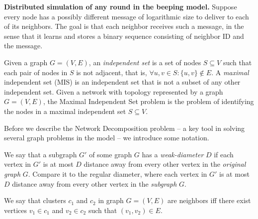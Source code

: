 {%

\noindent 
{\bf Distributed simulation of any \congest round in the beeping model.}
Suppose every node has a possibly different message of logarithmic size to deliver to each of its neighbors. 
The goal is that each neighbor receives such a message, in the sense that it learns and stores a binary sequence consisting of neighbor ID and the message. 



Given a graph $G=(V,E)$, an \emph{independent set} is a set of nodes $S\subseteq V$ such that each pair of nodes in $S$ is not adjacent, that is, $\forall u,v \in S : \{u,v\}\notin E$.
A \emph{maximal} independent set (MIS) is an independent set that is not a subset of any other independent set. 
Given a network with topology represented by a graph $G=(V,E)$, the Maximal Independent Set problem is the problem of identifying the nodes in a maximal independent set $S\subseteq V$.


Before we describe the Network Decomposition problem -- a key tool in solving several graph problems in the \congest model -- we introduce some notation. 

\begin{definition}
We say that a subgraph $G'$ of some graph $G$ has a \emph{weak-diameter} $D$ if each vertex in $G'$ is at most $D$ distance away from every other vertex in the \emph{original graph} $G$. Compare it to the regular diameter, where each vertex in $G'$ is at most $D$ distance away from every other vertex in the \emph{subgraph} $G$.
\end{definition}


\begin{definition}
    We say that clusters $c_1$ and $c_2$ in graph $G=(V,E)$ are neighbors iff there exist vertices $v_1 \in c_1$ and $v_2 \in c_2$ such that $(v_1,v_2) \in E$.
\end{definition}


}
